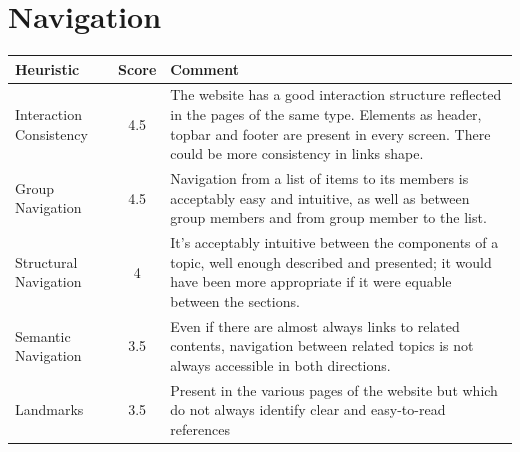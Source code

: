\section{Navigation}
\label{Navigation}
\begin{table}[H]
  \begin{center}
    \label{tab:table1}
    \begin{tabular}{||l|c|p{8cm}||} %
      \textbf{Heuristic} & \textbf{Score} & \textbf{Comment}\\
      
      \hline
      Interaction Consistency & 4.5 & The website has a good interaction structure reflected in the pages of the same type. Elements as header, topbar and footer are present in every screen. There could be more consistency in links shape.\\
      \hline
      Group Navigation & 4.5 & Navigation from a list of items to its members is acceptably easy and intuitive, as well as between group members and from group member to the list.\\
      \hline
      Structural Navigation & 4 & It's acceptably intuitive between the components of a topic, well enough described and presented; it would have been more appropriate if it were equable between the sections.\\
      \hline
      Semantic Navigation & 3.5 & Even if there are almost always links to related contents, navigation between related topics is not always accessible in both directions.\\
      Landmarks & 3.5 & Present in the various pages of the website but which do not always identify clear and easy-to-read references\\

    \end{tabular}
  \end{center}
\end{table}

